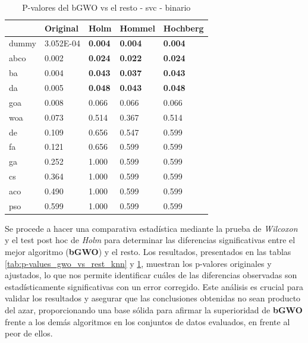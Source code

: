 \begin{table}[htp]
    \centering
    \begin{tabular}{lllll}
        \toprule
        {}    & Original  & Holm           & Hommel         & Hochberg       \\
        \midrule
        dummy & 3.052E-04 & \textbf{0.004} & \textbf{0.004} & \textbf{0.004} \\
        abco  & 0.002     & \textbf{0.024} & \textbf{0.022} & \textbf{0.024} \\
        ba    & 0.004     & \textbf{0.043} & \textbf{0.037} & \textbf{0.043} \\
        da    & 0.005     & \textbf{0.048} & \textbf{0.043} & \textbf{0.048} \\
        goa   & 0.008     & 0.066          & 0.066          & 0.066          \\
        woa   & 0.073     & 0.514          & 0.367          & 0.514          \\
        de    & 0.109     & 0.656          & 0.547          & 0.599          \\
        fa    & 0.121     & 0.656          & 0.599          & 0.599          \\
        ga    & 0.252     & 1.000          & 0.599          & 0.599          \\
        cs    & 0.364     & 1.000          & 0.599          & 0.599          \\
        aco   & 0.490     & 1.000          & 0.599          & 0.599          \\
        pso   & 0.599     & 1.000          & 0.599          & 0.599          \\
        \bottomrule
    \end{tabular}
    \caption{P-valores del bGWO vs el resto - svc - binario}
    \label{tab:p-values_gwo_vs_rest_svc}
\end{table}

Se procede a hacer una comparativa estadística mediante la prueba de \textit{Wilcoxon} y el test post hoc de \textit{Holm} para determinar las diferencias significativas entre el mejor algoritmo (\textbf{bGWO}) y el resto. Los resultados, presentados en las tablas \ref{tab:p-values_gwo_vs_rest_knn} y \ref{tab:p-values_gwo_vs_rest_svc}, muestran los p-valores originales y ajustados, lo que nos permite identificar cuáles de las diferencias observadas son estadísticamente significativas con un error corregido. Este análisis es crucial para validar los resultados y asegurar que las conclusiones obtenidas no sean producto del azar, proporcionando una base sólida para afirmar la superioridad de \textbf{bGWO} frente a los demás algoritmos en los conjuntos de datos evaluados, en frente al peor de ellos.\\[6pt]

